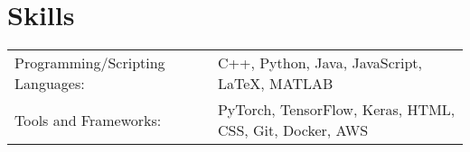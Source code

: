 \documentclass[a4paper,12pt]{article}
\begin{document}
\section{Skills}
\begin{tabularx}{\linewidth}{@{}l X@{}}
Programming/Scripting Languages: &  \normalsize{C++, Python, Java, JavaScript, \LaTeX, MATLAB}\\
Tools and Frameworks: &  \normalsize{PyTorch, TensorFlow, Keras, HTML, CSS, Git, Docker, AWS }\\
\end{tabularx}


\vfill
{}
\end{document}

